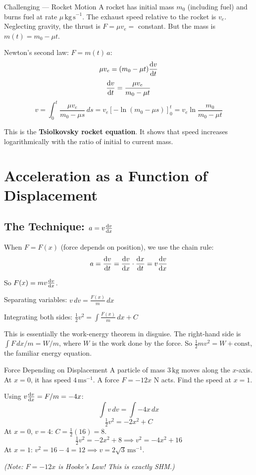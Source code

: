 \documentclass[12pt, a4paper]{book}
\newcommand{\ms}{\,\mathrm{ms}^{-1}}
\newcommand{\kg}{\,\mathrm{kg}}
\newcommand{\N}{\,\mathrm{N}}
\begin{document}
\begin{exmp}{Challenging --- Rocket Motion}{}
A rocket has initial mass $m_0$ (including fuel) and burns fuel at rate $\mu\,\mathrm{kg\,s}^{-1}$. The exhaust speed relative to the rocket is $v_e$. Neglecting gravity, the thrust is $F = \mu v_e = $ constant. But the mass is $m(t) = m_0 - \mu t$.

Newton's second law: $F = m(t)\,a$:
\[
  \mu v_e = (m_0 - \mu t)\dv{v}{t}
\]
\[
  \dv{v}{t} = \frac{\mu v_e}{m_0 - \mu t}
\]
\[
  v = \int_0^t \frac{\mu v_e}{m_0 - \mu s}\,ds = v_e\left[-\ln(m_0 - \mu s)\right]_0^t = v_e\ln\frac{m_0}{m_0 - \mu t}
\]

This is the \textbf{Tsiolkovsky rocket equation}. It shows that speed increases logarithmically with the ratio of initial to current mass.
\end{exmp}

\section{Acceleration as a Function of Displacement}

\subsection{The Technique: $a = v\dv{v}{x}$}

When $F = F(x)$ (force depends on position), we use the chain rule:
\[
  a = \dv{v}{t} = \dv{v}{x}\cdot\dv{x}{t} = v\dv{v}{x}
\]

So $F(x) = mv\dv{v}{x}$.

Separating variables: $v\,dv = \frac{F(x)}{m}\,dx$

Integrating both sides: $\tfrac{1}{2}v^2 = \int \frac{F(x)}{m}\,dx + C$

\begin{intuitionbox}
This is essentially the work-energy theorem in disguise. The right-hand side is $\int F\,dx / m = W/m$, where $W$ is the work done by the force. So $\frac{1}{2}mv^2 = W + \text{const}$, the familiar energy equation.
\end{intuitionbox}

\begin{exmp}{Force Depending on Displacement}{}
A particle of mass $3\kg$ moves along the $x$-axis. At $x = 0$, it has speed $4\ms$. A force $F = -12x\,\N$ acts. Find the speed at $x = 1$.

\medskip
Using $v\dv{v}{x} = F/m = -4x$:
\[
  \int v\,dv = \int -4x\,dx
\]
\[
  \tfrac{1}{2}v^2 = -2x^2 + C
\]
At $x = 0$, $v = 4$: $C = \tfrac{1}{2}(16) = 8$.
\[
  \tfrac{1}{2}v^2 = -2x^2 + 8 \implies v^2 = -4x^2 + 16
\]
At $x = 1$: $v^2 = 16 - 4 = 12 \implies v = 2\sqrt{3}\ms$.

\textit{(Note: $F = -12x$ is Hooke's Law! This is exactly SHM.)}
\end{exmp}
\end{document}
